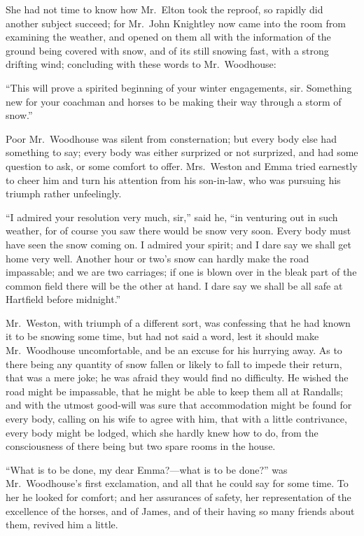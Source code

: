 She had not time to know how Mr.\ Elton took the reproof, so rapidly
did another subject succeed; for Mr.\ John Knightley now came
into the room from examining the weather, and opened on them
all with the information of the ground being covered with snow,
and of its still snowing fast, with a strong drifting wind;
concluding with these words to Mr.\ Woodhouse:

``This will prove a spirited beginning of your winter engagements,
sir.  Something new for your coachman and horses to be making
their way through a storm of snow.''

Poor Mr.\ Woodhouse was silent from consternation; but every body else
had something to say; every body was either surprized or not surprized,
and had some question to ask, or some comfort to offer.  Mrs.\ Weston
and Emma tried earnestly to cheer him and turn his attention
from his son-in-law, who was pursuing his triumph rather unfeelingly.

``I admired your resolution very much, sir,'' said he, ``in venturing
out in such weather, for of course you saw there would be snow
very soon.  Every body must have seen the snow coming on.
I admired your spirit; and I dare say we shall get home very well.
Another hour or two's snow can hardly make the road impassable;
and we are two carriages; if one is blown over in the bleak part
of the common field there will be the other at hand.  I dare say we
shall be all safe at Hartfield before midnight.''

Mr.\ Weston, with triumph of a different sort, was confessing that he
had known it to be snowing some time, but had not said a word,
lest it should make Mr.\ Woodhouse uncomfortable, and be an excuse
for his hurrying away.  As to there being any quantity of snow fallen
or likely to fall to impede their return, that was a mere joke;
he was afraid they would find no difficulty.  He wished the road might
be impassable, that he might be able to keep them all at Randalls;
and with the utmost good-will was sure that accommodation might
be found for every body, calling on his wife to agree with him,
that with a little contrivance, every body might be lodged,
which she hardly knew how to do, from the consciousness of there
being but two spare rooms in the house.

``What is to be done, my dear Emma?---what is to be done?''
was Mr.\ Woodhouse's first exclamation, and all that he could say
for some time.  To her he looked for comfort; and her assurances
of safety, her representation of the excellence of the horses,
and of James, and of their having so many friends about them,
revived him a little.

